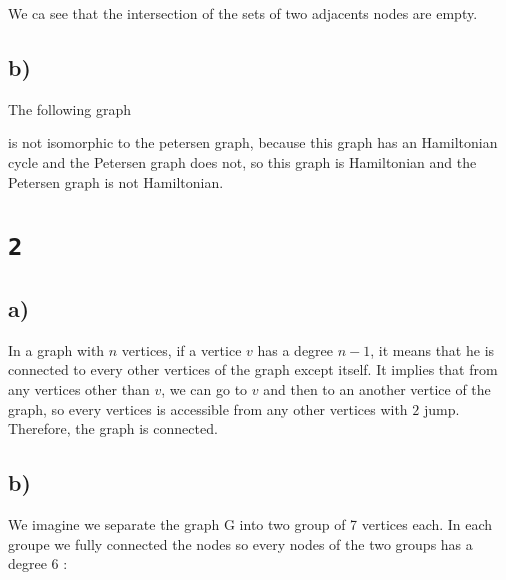 \documentclass[a4paper,11pt]{report}
\begin{document}
We ca see that the intersection of the sets of two adjacents nodes are empty.

\subsection*{b)}

The following graph

\begin{center}
\end{center}

is not isomorphic to the petersen graph, because this graph has an Hamiltonian
cycle and the Petersen graph does not, so this graph is Hamiltonian and the
Petersen graph is not Hamiltonian.

\section*{\texttt{2}}

\subsection*{a)}

In a graph with $n$ vertices, if a vertice $v$ has a degree $n-1$, it means that he
is connected to every other vertices of the graph except itself. It implies that
from any vertices other than $v$, we can go to $v$ and then to an another
vertice of the graph, so every vertices is accessible from any other vertices
with $2$ jump. Therefore, the graph is connected.

\subsection*{b)}

We imagine we separate the graph G into two group of 7 vertices each. In each
groupe we fully connected the nodes so every nodes of the two groups has a
degree $6$ :
\end{document}
